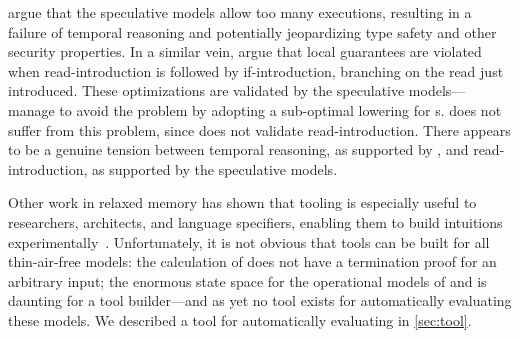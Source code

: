 \citet{DBLP:journals/pacmpl/JagadeesanJR20} argue that the speculative models
allow too many executions, resulting in a failure of temporal reasoning and
potentially jeopardizing type safety and other security properties.  In a
similar vein, \citet{promising-ldrf} argue that local \drf{} guarantees are
violated when read-introduction is followed by if-introduction, branching on
the read just introduced.  These optimizations are validated by the
speculative models---\citeauthor{promising-ldrf} manage to avoid the problem
by adopting a sub-optimal lowering for \RMW{}s.  \PwT{} does not suffer from
this problem, since \PwT{} does not validate read-introduction.  There appears to be a genuine tension
between temporal reasoning, as supported by \PwT{}, and read-introduction, as
supported by the speculative models.

Other work in relaxed memory has shown that tooling is especially useful to
researchers, architects, and language specifiers, enabling them to build
intuitions
experimentally~\cite{DBLP:conf/esop/PaviottiCPWOB20,PrideMM,alglave,Batty:2011:MCC:1926385.1926394}.
Unfortunately, it is not obvious that tools can be built for all
thin-air-free models: the calculation of
\citet{Pichon-Pharabod:2016:CSR:2837614.2837616} does not have a termination
proof for an arbitrary input; the enormous state space for the
operational models of \citet{DBLP:conf/popl/KangHLVD17} and
\citet{DBLP:journals/pacmpl/ChakrabortyV19} is daunting for a tool
builder---and as yet no tool exists for automatically evaluating these
models.  We described a tool for automatically evaluating \PwT{} in
\textsection\ref{sec:tool}.
